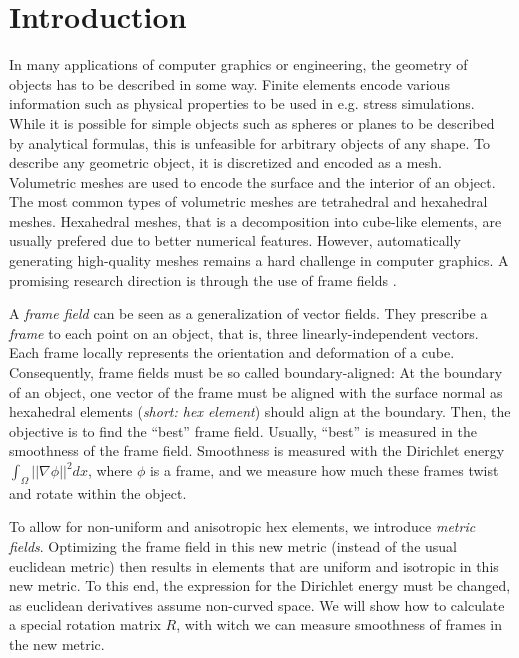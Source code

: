 \documentclass[../thesis.tex]{subfiles}
\begin{document}
\chapter{Introduction}
\label{ch:intro}
In many applications of computer graphics or engineering, the geometry of objects
has to be described in some way. Finite elements encode various information such as physical properties
to be used in e.g. stress simulations.
While it is possible for simple objects such as spheres or planes to be described by
analytical formulas, this is unfeasible for arbitrary objects of any shape.
To describe any geometric object, it is discretized and encoded as a mesh.
Volumetric meshes are used to encode the surface and the interior of an object.
The most common types of volumetric meshes are tetrahedral and hexahedral meshes.
Hexahedral meshes, that is a decomposition into cube-like elements,
are usually prefered due to better numerical features.
However, automatically generating high-quality meshes remains a hard challenge
in computer graphics.
A promising research direction is through the use of frame fields \cite{Hex22}.

A \emph{frame field} can be seen as a generalization of vector fields.
They prescribe a \emph{frame} to each point on an object, that is, three linearly-independent
vectors. Each frame locally represents the orientation and deformation of a cube.
Consequently, frame fields must be so called boundary-aligned:
At the boundary of an object, one vector of the frame must be aligned with the surface normal
as hexahedral elements (\emph{short: hex element}) should align at the boundary.
Then, the objective is to find the ``best'' frame field.
Usually, ``best'' is measured in the smoothness of the frame field.
Smoothness is measured with the Dirichlet energy $\int_{\Omega}||\nabla \phi||^2dx$,
where $\phi$ is a frame, and we measure how much these frames twist and rotate within the object.

To allow for non-uniform and anisotropic hex elements, we introduce
\emph{metric fields}. Optimizing the frame field in this new metric (instead of the usual euclidean metric) then results
in elements that are uniform and isotropic in this new metric.
To this end, the expression for the Dirichlet energy must be changed, as euclidean derivatives
assume non-curved space.
We will show how to calculate a special rotation matrix $R$, with witch we can measure
smoothness of frames in the new metric.
\end{document}
